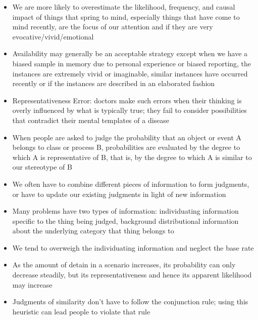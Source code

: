 \documentclass[12pt]{article}
\begin{document}
\begin{itemize}
\item We are more likely to overestimate the likelihood, frequency, and causal impact of things that spring to mind, especially things that have come to mind recently, are the focus of our attention and if they are very evocative/vivid/emotional 
\item Availability may generally be an acceptable strategy except when we have a biased sample in memory due to personal experience or biased reporting, the instances are extremely vivid or imaginable, similar instances have occurred recently or if the instances are described in an elaborated fashion
\item Representativeness Error: doctors make such errors when their thinking is overly influenced by what is typically true; they fail to consider possibilities that contradict their mental templates of a disease 
\item When people are asked to judge the probability that an object or event A belongs to class or process B, probabilities are evaluated by the degree to which A is representative of B, that is, by the degree to which A is similar to our stereotype of B
\item We often have to combine different pieces of information to form judgments, or have to update our existing judgments in light of new information 
\item Many problems have two types of information: individuating information specific to the thing being judged, background distributional information about the underlying category that thing belongs to 
\item We tend to overweigh the individuating information and neglect the base rate 
\item As the amount of detain in a scenario increases, its probability can only decrease steadily, but its representativeness and hence its apparent likelihood may increase
\item Judgments of similarity don't have to follow the conjunction rule; using this heuristic can lead people to violate that rule 
\end{itemize}
\newpage
\end{document}
